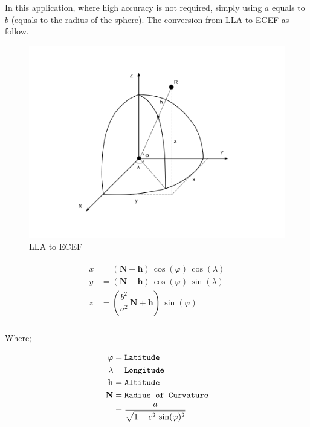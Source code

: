 In this application, where high accuracy is not required, simply using $a$ equals to $b$ (equals to the radius of the sphere). The conversion from LLA to ECEF as follow. 

\begin{figure}[H]
\caption{LLA to ECEF}
\label{fig:lla2ecef}
\centering
\includegraphics[width=\textwidth, keepaspectratio]{Figures/lla2ecef.png}
\decoRule
\end{figure}

\[
\begin{array}{lr}
\begin{aligned}
x &= (\mathbf{N} + \mathbf{h})\,\cos(\varphi)\,\cos(\lambda)\\
y &= (\mathbf{N} + \mathbf{h})\,\cos(\varphi)\,\sin(\lambda)\\
z &= (\dfrac{b^2}{a^2}\,\mathbf{N} + \mathbf{h})\,\sin(\varphi)\\
\end{aligned}
\end{array}
\]

Where;

\[
\begin{array}{lr}
\begin{aligned}
\varphi &= \texttt{Latitude}\\
\lambda &= \texttt{Longitude}\\
\mathbf{h} &= \texttt{Altitude}\\
\mathbf{N} &= \texttt{Radius of Curvature}\\
&= \dfrac{a}{\sqrt{1 - e^2\,\sin(\varphi)^2}}\\
\end{aligned}
\end{array}
\]

